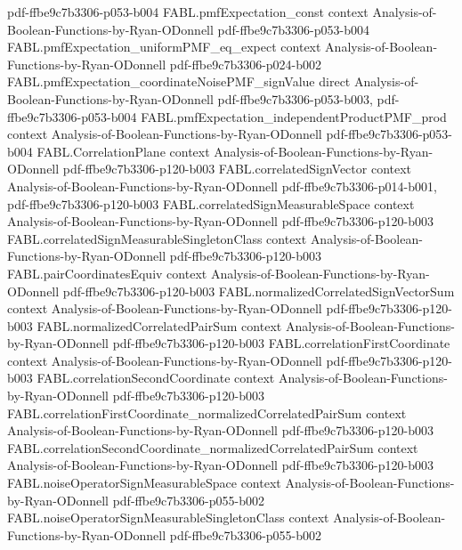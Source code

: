 \begin{theorem}
  {pdf-ffbe9c7b3306-p053-b004}
\proofstep
  {FABL.pmfExpectation_const}
  {context}
  {Analysis-of-Boolean-Functions-by-Ryan-ODonnell}
  {pdf-ffbe9c7b3306-p053-b004}
\proofstep
  {FABL.pmfExpectation_uniformPMF_eq_expect}
  {context}
  {Analysis-of-Boolean-Functions-by-Ryan-ODonnell}
  {pdf-ffbe9c7b3306-p024-b002}
\proofstep
  {FABL.pmfExpectation_coordinateNoisePMF_signValue}
  {direct}
  {Analysis-of-Boolean-Functions-by-Ryan-ODonnell}
  {pdf-ffbe9c7b3306-p053-b003,
    pdf-ffbe9c7b3306-p053-b004}
\proofstep
  {FABL.pmfExpectation_independentProductPMF_prod}
  {context}
  {Analysis-of-Boolean-Functions-by-Ryan-ODonnell}
  {pdf-ffbe9c7b3306-p053-b004}
\proofstep
  {FABL.CorrelationPlane}
  {context}
  {Analysis-of-Boolean-Functions-by-Ryan-ODonnell}
  {pdf-ffbe9c7b3306-p120-b003}
\proofstep
  {FABL.correlatedSignVector}
  {context}
  {Analysis-of-Boolean-Functions-by-Ryan-ODonnell}
  {pdf-ffbe9c7b3306-p014-b001,
    pdf-ffbe9c7b3306-p120-b003}
\proofstep
  {FABL.correlatedSignMeasurableSpace}
  {context}
  {Analysis-of-Boolean-Functions-by-Ryan-ODonnell}
  {pdf-ffbe9c7b3306-p120-b003}
\proofstep
  {FABL.correlatedSignMeasurableSingletonClass}
  {context}
  {Analysis-of-Boolean-Functions-by-Ryan-ODonnell}
  {pdf-ffbe9c7b3306-p120-b003}
\proofstep
  {FABL.pairCoordinatesEquiv}
  {context}
  {Analysis-of-Boolean-Functions-by-Ryan-ODonnell}
  {pdf-ffbe9c7b3306-p120-b003}
\proofstep
  {FABL.normalizedCorrelatedSignVectorSum}
  {context}
  {Analysis-of-Boolean-Functions-by-Ryan-ODonnell}
  {pdf-ffbe9c7b3306-p120-b003}
\proofstep
  {FABL.normalizedCorrelatedPairSum}
  {context}
  {Analysis-of-Boolean-Functions-by-Ryan-ODonnell}
  {pdf-ffbe9c7b3306-p120-b003}
\proofstep
  {FABL.correlationFirstCoordinate}
  {context}
  {Analysis-of-Boolean-Functions-by-Ryan-ODonnell}
  {pdf-ffbe9c7b3306-p120-b003}
\proofstep
  {FABL.correlationSecondCoordinate}
  {context}
  {Analysis-of-Boolean-Functions-by-Ryan-ODonnell}
  {pdf-ffbe9c7b3306-p120-b003}
\proofstep
  {FABL.correlationFirstCoordinate_normalizedCorrelatedPairSum}
  {context}
  {Analysis-of-Boolean-Functions-by-Ryan-ODonnell}
  {pdf-ffbe9c7b3306-p120-b003}
\proofstep
  {FABL.correlationSecondCoordinate_normalizedCorrelatedPairSum}
  {context}
  {Analysis-of-Boolean-Functions-by-Ryan-ODonnell}
  {pdf-ffbe9c7b3306-p120-b003}
\proofstep
  {FABL.noiseOperatorSignMeasurableSpace}
  {context}
  {Analysis-of-Boolean-Functions-by-Ryan-ODonnell}
  {pdf-ffbe9c7b3306-p055-b002}
\proofstep
  {FABL.noiseOperatorSignMeasurableSingletonClass}
  {context}
  {Analysis-of-Boolean-Functions-by-Ryan-ODonnell}
  {pdf-ffbe9c7b3306-p055-b002}

\end{theorem}
